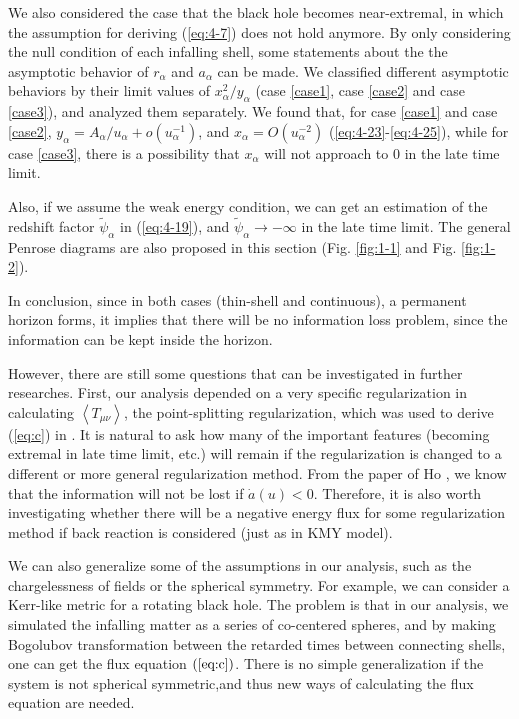\documentclass[letterpaper,12pt]{article}
\begin{document}
We also considered the case that the black hole becomes near-extremal, in which the assumption for deriving (\ref{eq:4-7}) does not hold anymore. By only considering the null condition of each infalling shell, some statements about the the asymptotic behavior of $r_{\alpha}$ and $a_{\alpha}$ can be made. We classified different asymptotic behaviors by their limit values of $x_{\alpha}^{2}/y_{\alpha}$ (case \ref{case1}, case \ref{case2} and case \ref{case3}), and analyzed them separately. We found that, for case \ref{case1} and case \ref{case2}, $y_{\alpha} = A_{\alpha}/ u_{\alpha} + o(u_{\alpha}^{-1})$, and $x_{\alpha} = O(u_{\alpha}^{-2})$ (\ref{eq:4-23}-\ref{eq:4-25}), while for case \ref{case3}, there is a possibility that $x_{\alpha}$ will not approach to 0 in the late time limit.

Also, if we assume the weak energy condition, we can get an estimation of the redshift factor $\tilde{\psi}_{\alpha}$ in (\ref{eq:4-19}), and $\tilde{\psi}_{\alpha} \rightarrow -\infty$ in the late time limit. The general Penrose diagrams are also proposed in this section (Fig. \ref{fig:1-1} and Fig. \ref{fig:1-2}).

In conclusion, since in both cases (thin-shell and continuous), a permanent horizon forms, it implies that there will be no information loss problem, since the information can be kept inside the horizon.

However, there are still some questions that can be investigated in further researches. First, our analysis depended on a very specific regularization in calculating $\left\langle T_{\mu\nu}\right\rangle$, the point-splitting regularization, which was used to derive (\ref{eq:c}) in \cite{kawai2013self}. It is natural to ask how many of the important features (becoming extremal in late time limit, etc.) will remain if the regularization is changed to a different or more general regularization method. From the paper of Ho \cite{ho2015comment}, we know that the information will not be lost if $\dot{a}(u) < 0$. Therefore, it is also worth investigating whether there will be a negative energy flux for some regularization method if back reaction is considered (just as in KMY model). 

We can also generalize some of the assumptions in our analysis, such as the chargelessness of fields or the spherical symmetry. For example, we can consider a Kerr-like metric for a rotating black hole. The problem is that in our analysis, we simulated the infalling matter as a series of co-centered spheres, and by making Bogolubov transformation between the retarded times between connecting shells, one can get the flux equation $(\ref{eq:c})$. There is no simple generalization if the system is not spherical symmetric,and thus new ways of calculating the flux equation are needed.
\end{document}
